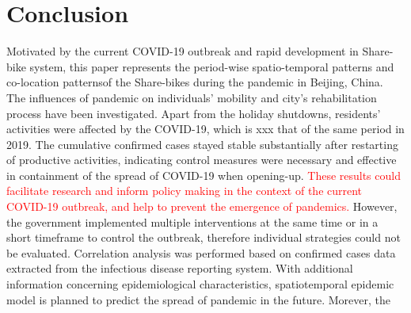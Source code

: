 \documentclass[preprints,ijgi,submit,moreauthors]{Definitions/mdpi}
\begin{document}
\section{Conclusion}

Motivated by the current COVID-19 outbreak and rapid development in Share-bike system, this paper represents the period-wise spatio-temporal patterns and co-location patternsof the Share-bikes during the pandemic in Beijing, China.
The influences of pandemic on individuals' mobility and city's rehabilitation process have been investigated.
Apart from the holiday shutdowns, residents' activities were affected by the COVID-19, which is xxx that of the same period in 2019. 
The cumulative confirmed cases stayed stable substantially after restarting of productive activities, indicating control measures were necessary and effective in containment of the spread of COVID-19 when opening-up.   
\textcolor{red}{These results could facilitate research and inform policy making in the context of the current COVID-19 outbreak, and help to prevent the emergence of pandemics.} 
However, the government implemented multiple interventions at the same time or in a short timeframe to control the outbreak, therefore individual strategies could not be evaluated.
Correlation analysis was performed based on confirmed cases data extracted from the infectious disease reporting system. 
With additional information concerning epidemiological characteristics, spatiotemporal epidemic model is planned to predict the spread of pandemic in the future.
Morever, the
\vspace{6pt} 


\end{document}
